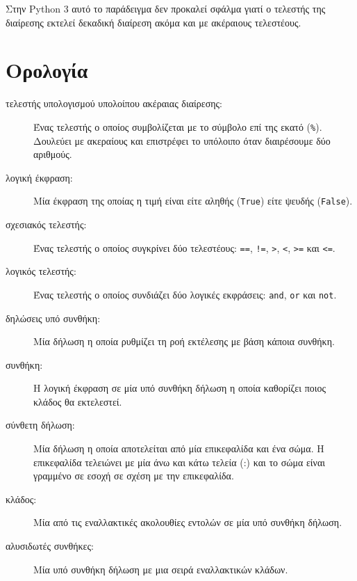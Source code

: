 \documentclass[10pt]{book}
\begin{document}
Στην Python 3 αυτό το παράδειγμα δεν προκαλεί σφάλμα γιατί ο τελεστής
της διαίρεσης εκτελεί δεκαδική διαίρεση ακόμα και με ακέραιους τελεστέους.


\section{Ορολογία}

\begin{description}

\item[τελεστής υπολογισμού υπολοίπου ακέραιας διαίρεσης:] Ένας τελεστής 
ο οποίος συμβολίζεται με το σύμβολο επί της εκατό ({\tt \%}). Δουλεύει
με ακεραίους και επιστρέφει το υπόλοιπο όταν διαιρέσουμε δύο αριθμούς.

\item[λογική έκφραση:]  Μία έκφραση της οποίας η τιμή είναι είτε αληθής  ({\tt True}) 
είτε ψευδής  ({\tt False}).

\item[σχεσιακός τελεστής:]  Ένας τελεστής ο οποίος συγκρίνει δύο τελεστέους: 
{\tt ==}, {\tt !=}, {\tt >}, {\tt <}, {\tt >=} και {\tt <=}.

\item[λογικός τελεστής:]  Ένας τελεστής ο οποίος συνδιάζει δύο λογικές εκφράσεις: 
{\tt and}, {\tt or} και {\tt not}.

\item[δηλώσεις υπό συνθήκη:]  Μία δήλωση η οποία ρυθμίζει τη ροή εκτέλεσης με βάση 
κάποια συνθήκη.

\item[συνθήκη:]  Η λογική έκφραση σε μία υπό συνθήκη δήλωση η οποία καθορίζει ποιος κλάδος θα εκτελεστεί.

\item[σύνθετη δήλωση:]  Μία δήλωση η οποία αποτελείται από μία επικεφαλίδα και
ένα σώμα. Η επικεφαλίδα τελειώνει με μία άνω και κάτω τελεία  (:) και το σώμα
είναι γραμμένο σε εσοχή σε σχέση με την επικεφαλίδα.

\item[κλάδος:] Μία από τις εναλλακτικές ακολουθίες εντολών σε μία υπό συνθήκη
δήλωση.

\item[αλυσιδωτές συνθήκες:]  Μία υπό συνθήκη δήλωση με μια σειρά εναλλακτικών
κλάδων.


\end{description}
\end{document}
